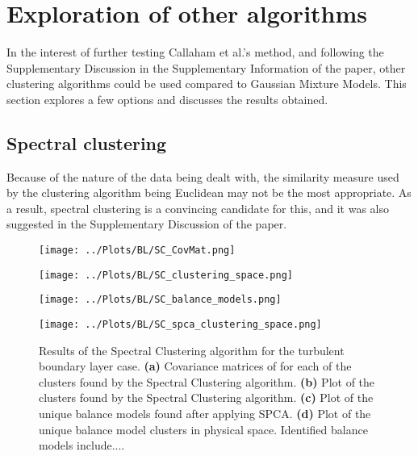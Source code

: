 \documentclass[12pt]{report} %
\begin{document}
\section{Exploration of other algorithms}

In the interest of further testing Callaham et al.’s method, and following the Supplementary Discussion in the Supplementary Information of the paper\cite{callaham2021learning}, other clustering algorithms could be used compared to Gaussian Mixture Models. This section explores a few options and discusses the results obtained.

\subsection{Spectral clustering}

Because of the nature of the data being dealt with, the similarity measure used by the clustering algorithm being Euclidean may not be the most appropriate. As a result, spectral clustering is a convincing candidate for this, and it was also suggested in the Supplementary Discussion of the paper\cite[Supplementary Information]{callaham2021learning}.

\begin{figure}[htbp]
  \centering

  \begin{minipage}{0.7\textwidth}
    \centering
    \texttt{[image: ../Plots/BL/SC\_CovMat.png]}
    \subcaption{}
  \end{minipage}

  \begin{minipage}{\textwidth}
      \begin{minipage}[b]{0.6\textwidth}
          \centering
          \texttt{[image: ../Plots/BL/SC\_clustering\_space.png]}
          \subcaption{}
      \end{minipage}
      \begin{minipage}[b]{0.35\textwidth}
          \centering
          \texttt{[image: ../Plots/BL/SC\_balance\_models.png]}
          \subcaption{}
      \end{minipage}
  \end{minipage}

  \begin{minipage}{0.7\textwidth}
      \centering
      \texttt{[image: ../Plots/BL/SC\_spca\_clustering\_space.png]}
      \subcaption{}
  \end{minipage}

  \caption{Results of the Spectral Clustering algorithm for the turbulent boundary layer case. \textbf{(a)} Covariance matrices of for each of the clusters found by the Spectral Clustering algorithm. \textbf{(b)} Plot of the clusters found by the Spectral Clustering algorithm. \textbf{(c)} Plot of the unique balance models found after applying SPCA. \textbf{(d)} Plot of the unique balance model clusters in physical space. Identified balance models include....}

  \label{fig:SC_results}
\end{figure}
\end{document}
